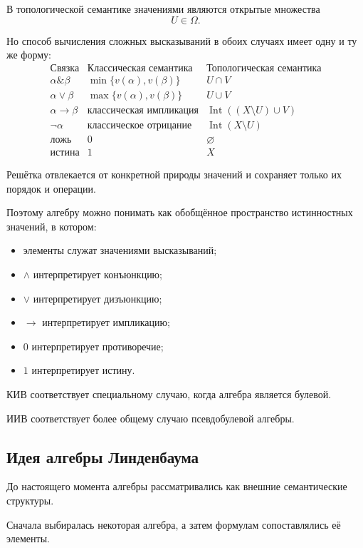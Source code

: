 \documentclass[12pt,a4paper,oneside,openany]{book}
\theoremstyle{definition}
\theoremstyle{plain}
\theoremstyle{remark}
\begin{document}
В топологической семантике значениями являются открытые множества
\[
U\in\Omega.
\]

Но способ вычисления сложных высказываний в обоих случаях имеет одну
и ту же форму:
\[
\begin{array}{c|c|c}
\text{Связка}
&
\text{Классическая семантика}
&
\text{Топологическая семантика}
\\
\hline
\alpha\mathbin{\&}\beta
&
\min\{v(\alpha),v(\beta)\}
&
U\cap V
\\[1mm]
\alpha\lor\beta
&
\max\{v(\alpha),v(\beta)\}
&
U\cup V
\\[1mm]
\alpha\to\beta
&
\text{классическая импликация}
&
\operatorname{Int}((X\setminus U)\cup V)
\\[1mm]
\neg\alpha
&
\text{классическое отрицание}
&
\operatorname{Int}(X\setminus U)
\\[1mm]
\text{ложь}
&
0
&
\varnothing
\\[1mm]
\text{истина}
&
1
&
X
\end{array}
\]

Решётка отвлекается от конкретной природы значений и сохраняет только
их порядок и операции.

Поэтому алгебру можно понимать как обобщённое пространство
истинностных значений, в котором:

\begin{itemize}
    \item элементы служат значениями высказываний;
    \item \(\wedge\) интерпретирует конъюнкцию;
    \item \(\vee\) интерпретирует дизъюнкцию;
    \item \(\to\) интерпретирует импликацию;
    \item \(0\) интерпретирует противоречие;
    \item \(1\) интерпретирует истину.
\end{itemize}

КИВ соответствует специальному случаю, когда алгебра является
булевой.

ИИВ соответствует более общему случаю псевдобулевой алгебры.


\subsection{Идея алгебры Линденбаума}

До настоящего момента алгебры рассматривались как внешние
семантические структуры.

Сначала выбиралась некоторая алгебра, а затем формулам
сопоставлялись её элементы.
\end{document}
